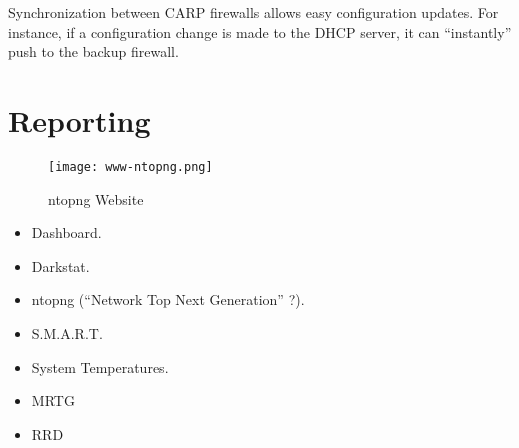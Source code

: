 Synchronization between CARP firewalls allows easy configuration updates. For
instance, if a configuration change is made to the DHCP server, it can
``instantly'' push to the backup firewall.


\section{Reporting}

\begin{figure}[h!]
\texttt{[image: www-ntopng.png]}
 \caption{ntopng Website}
 \label{fig:www-ntopng}
\end{figure}

\begin{itemize}
 \item Dashboard.
 \item Darkstat.
 \item ntopng (``Network Top Next Generation'' ?).
 \item S.M.A.R.T.
 \item System Temperatures.
 \item MRTG
 \item RRD
\end{itemize}

